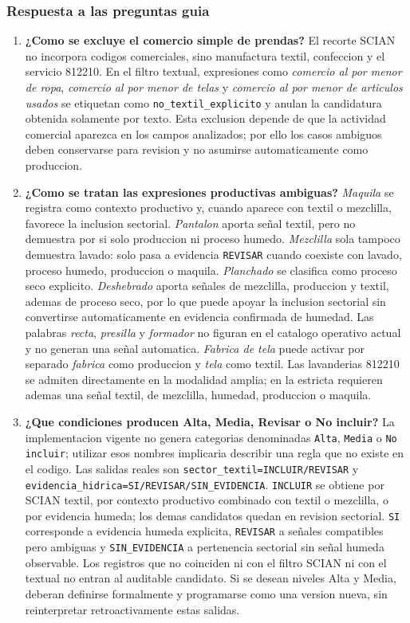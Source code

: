 \documentclass[11pt,letterpaper]{article}
\begin{document}
\subsubsection*{Respuesta a las preguntas guia}

\begin{enumerate}
    \item \textbf{¿Como se excluye el comercio simple de prendas?}
    El recorte SCIAN no incorpora codigos comerciales, sino manufactura textil, confeccion y el servicio 812210. En el filtro textual, expresiones como \textit{comercio al por menor de ropa}, \textit{comercio al por menor de telas} y \textit{comercio al por menor de articulos usados} se etiquetan como \texttt{no\_textil\_explicito} y anulan la candidatura obtenida solamente por texto. Esta exclusion depende de que la actividad comercial aparezca en los campos analizados; por ello los casos ambiguos deben conservarse para revision y no asumirse automaticamente como produccion.

    \item \textbf{¿Como se tratan las expresiones productivas ambiguas?}
    \textit{Maquila} se registra como contexto productivo y, cuando aparece con textil o mezclilla, favorece la inclusion sectorial. \textit{Pantalon} aporta señal textil, pero no demuestra por si solo produccion ni proceso humedo. \textit{Mezclilla} sola tampoco demuestra lavado: solo pasa a evidencia \texttt{REVISAR} cuando coexiste con lavado, proceso humedo, produccion o maquila. \textit{Planchado} se clasifica como proceso seco explicito. \textit{Deshebrado} aporta señales de mezclilla, produccion y textil, ademas de proceso seco, por lo que puede apoyar la inclusion sectorial sin convertirse automaticamente en evidencia confirmada de humedad. Las palabras \textit{recta}, \textit{presilla} y \textit{formador} no figuran en el catalogo operativo actual y no generan una señal automatica. \textit{Fabrica de tela} puede activar por separado \textit{fabrica} como produccion y \textit{tela} como textil. Las lavanderias 812210 se admiten directamente en la modalidad amplia; en la estricta requieren ademas una señal textil, de mezclilla, humedad, produccion o maquila.

    \item \textbf{¿Que condiciones producen Alta, Media, Revisar o No incluir?}
    La implementacion vigente no genera categorias denominadas \texttt{Alta}, \texttt{Media} o \texttt{No incluir}; utilizar esos nombres implicaria describir una regla que no existe en el codigo. Las salidas reales son \texttt{sector\_textil=INCLUIR/REVISAR} y \texttt{evidencia\_hidrica=SI/REVISAR/SIN\_EVIDENCIA}. \texttt{INCLUIR} se obtiene por SCIAN textil, por contexto productivo combinado con textil o mezclilla, o por evidencia humeda; los demas candidatos quedan en revision sectorial. \texttt{SI} corresponde a evidencia humeda explicita, \texttt{REVISAR} a señales compatibles pero ambiguas y \texttt{SIN\_EVIDENCIA} a pertenencia sectorial sin señal humeda observable. Los registros que no coinciden ni con el filtro SCIAN ni con el textual no entran al auditable candidato. Si se desean niveles Alta y Media, deberan definirse formalmente y programarse como una version nueva, sin reinterpretar retroactivamente estas salidas.


\end{enumerate}
\end{document}
